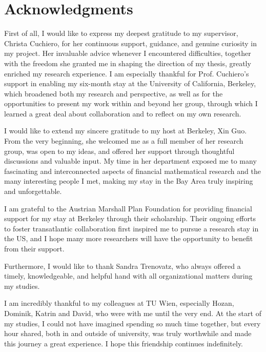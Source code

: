 \documentclass[
    a4paper,
    11pt,
    bibliography=totoc,
    listof=totoc,      
    headinclude=true,
    cleardoublepage=empty,
]{scrbook}
\theoremstyle{plain}
\theoremstyle{definition}
\theoremstyle{remark}
\begin{document}

\chapter*{Acknowledgments}

First of all, I would like to express my deepest gratitude to my supervisor, Christa Cuchiero, for her continuous support, guidance, and genuine curiosity in my project. Her invaluable advice whenever I encountered difficulties, together with the freedom she granted me in shaping the direction of my thesis, greatly enriched my research experience. I am especially thankful for Prof. Cuchiero's support in enabling my six-month stay at the University of California, Berkeley, which broadened both my research and perspective, as well as for the opportunities to present my work within and beyond her group, through which I learned a great deal about collaboration and to reflect on my own research.

I would like to extend my sincere gratitude to my host at Berkeley, Xin Guo. From the very beginning, she welcomed me as a full member of her research group, was open to my ideas, and offered her support through thoughtful discussions and valuable input. My time in her department exposed me to many fascinating and interconnected aspects of financial mathematical research and the many interesting people I met, making my stay in the Bay Area truly inspiring and unforgettable.

I am grateful to the Austrian Marshall Plan Foundation for providing financial support for my stay at Berkeley through their scholarship. Their ongoing efforts to foster transatlantic collaboration first inspired me to pursue a research stay in the US, and I hope many more researchers will have the opportunity to benefit from their support.

Furthermore, I would like to thank Sandra Trenovatz, who always offered a timely, knowledgeable, and helpful hand with all organizational matters during my studies.

I am incredibly thankful to my colleagues at TU Wien, especially Hozan, Dominik, Katrin and David, who were with me until the very end. At the start of my studies, I could not have imagined spending so much time together, but every hour shared, both in and outside of university, was truly worthwhile and made this journey a great experience. I hope this friendship continues indefinitely.
\end{document}
